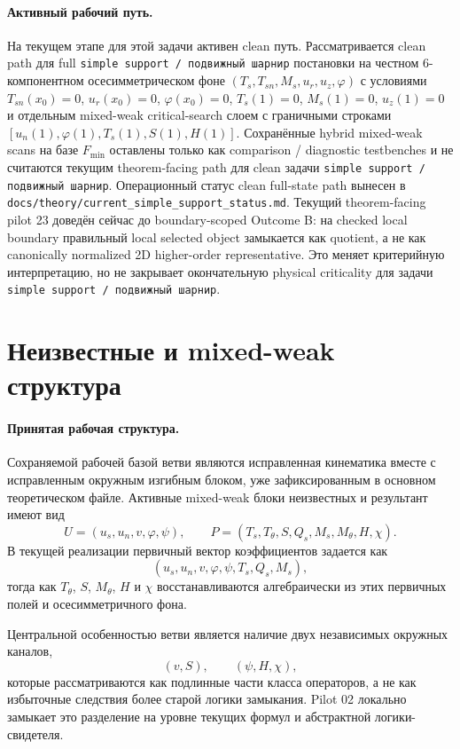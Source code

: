 \documentclass[11pt,a4paper]{article}
\begin{document}
\paragraph{Активный рабочий путь.}
На текущем этапе для этой задачи активен clean путь.
Рассматривается clean path для full \texttt{simple support / подвижный шарнир}
постановки на честном 6-компонентном осесимметрическом фоне
$(T_s,T_{sn},M_s,u_r,u_z,\varphi)$ с условиями
$T_{sn}(x_0)=0$, $u_r(x_0)=0$, $\varphi(x_0)=0$, $T_s(1)=0$, $M_s(1)=0$,
$u_z(1)=0$ и отдельным mixed-weak critical-search слоем с граничными строками
$[u_n(1),\varphi(1),T_s(1),S(1),H(1)]$.
Сохранённые hybrid mixed-weak scans на базе $F_{\min}$ оставлены только как
comparison / diagnostic testbenches и не считаются текущим theorem-facing path
для clean задачи \texttt{simple support / подвижный шарнир}.
Операционный статус clean full-state path вынесен в
\texttt{docs/theory/current_simple_support_status.md}. Текущий theorem-facing pilot 23
доведён сейчас до boundary-scoped Outcome B: на checked local boundary
правильный local selected object замыкается как quotient, а не как canonically normalized 2D
higher-order representative. Это меняет критерийную интерпретацию, но не
закрывает окончательную physical criticality для задачи
\texttt{simple support / подвижный шарнир}.

\section{Неизвестные и mixed-weak структура}
\paragraph{Принятая рабочая структура.}
Сохраняемой рабочей базой ветви являются исправленная кинематика вместе с
исправленным окружным изгибным блоком, уже зафиксированным в основном
теоретическом файле.
Активные mixed-weak блоки неизвестных и результант имеют вид
\[
U = (u_s, u_n, v, \varphi, \psi),
\qquad
P = (T_s, T_\theta, S, Q_s, M_s, M_\theta, H, \chi).
\]
В текущей реализации первичный вектор коэффициентов задается как
\[
(u_s, u_n, v, \varphi, \psi, T_s, Q_s, M_s),
\]
тогда как $T_\theta$, $S$, $M_\theta$, $H$ и $\chi$ восстанавливаются
алгебраически из этих первичных полей и осесимметричного фона.

Центральной особенностью ветви является наличие двух независимых окружных
каналов,
\[
(v,S), \qquad (\psi,H,\chi),
\]
которые рассматриваются как подлинные части класса операторов, а не как
избыточные следствия более старой логики замыкания.
Pilot 02 локально замыкает это разделение на уровне текущих формул и
абстрактной логики-свидетеля.
\end{document}
